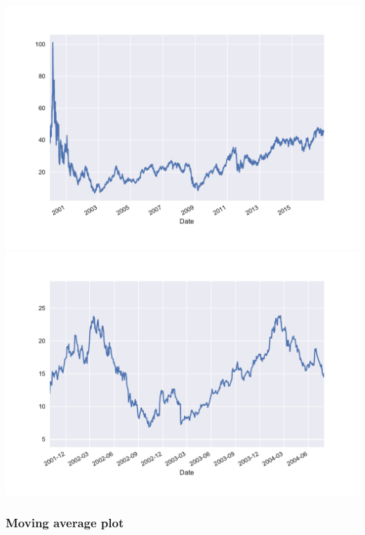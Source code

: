 \documentclass[12pt, a4paper]{article}
\begin{document}
\bgroup
  \inputminted[linenos, breaklines=true, fontsize=\scriptsize, firstnumber=last]{python}{src/stocks/simple/2_onestock.py}
  \label{listing:ssimp_2}
\egroup

\begin{multicols}{2}
{\centering
\includegraphics[width=\columnwidth]{src/stocks/simple/oneplot}\\
\label{fig:stock_oneplot}}
{\centering
\includegraphics[width=\columnwidth]{src/stocks/simple/oneplot_zoom}\\
\label{fig:stock_oneplot_zoom}}
\end{multicols}

\subsubsection{Moving average plot}
\end{document}
